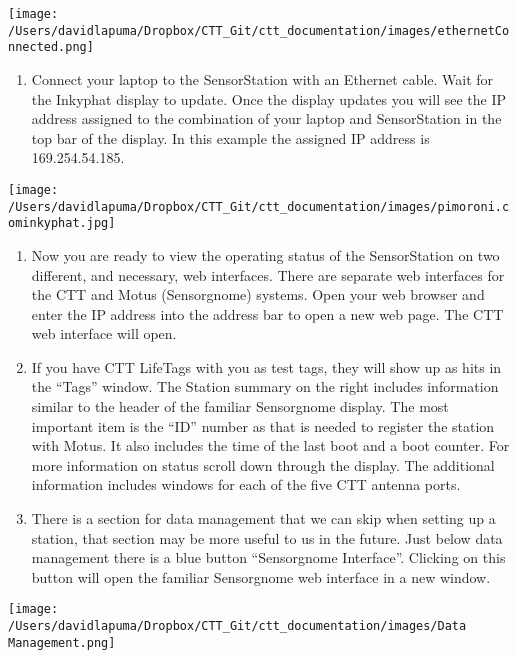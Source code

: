 \documentclass[
]{article}
\providecommand{\tightlist}{%
  \setlength{\itemsep}{0pt}\setlength{\parskip}{0pt}}
\begin{document}
\texttt{[image: /Users/davidlapuma/Dropbox/CTT\_Git/ctt\_documentation/images/ethernetConnected.png]}

\begin{enumerate}
\def\labelenumi{\arabic{enumi}.}
\setcounter{enumi}{7}
\tightlist
\item
  Connect your laptop to the SensorStation with an Ethernet cable. Wait
  for the Inkyphat display to update. Once the display updates you will
  see the IP address assigned to the combination of your laptop and
  SensorStation in the top bar of the display. In this example the
  assigned IP address is 169.254.54.185.
\end{enumerate}

\texttt{[image: /Users/davidlapuma/Dropbox/CTT\_Git/ctt\_documentation/images/pimoroni.cominkyphat.jpg]}

\begin{enumerate}
\def\labelenumi{\arabic{enumi}.}
\setcounter{enumi}{8}
\item
  Now you are ready to view the operating status of the SensorStation on
  two different, and necessary, web interfaces. There are separate web
  interfaces for the CTT and Motus (Sensorgnome) systems. Open your web
  browser and enter the IP address into the address bar to open a new
  web page. The CTT web interface will open.
\item
  If you have CTT LifeTags with you as test tags, they will show up as
  hits in the ``Tags'' window. The Station summary on the right includes
  information similar to the header of the familiar Sensorgnome display.
  The most important item is the ``ID'' number as that is needed to
  register the station with Motus. It also includes the time of the last
  boot and a boot counter. For more information on status scroll down
  through the display. The additional information includes windows for
  each of the five CTT antenna ports.
\item
  There is a section for data management that we can skip when setting
  up a station, that section may be more useful to us in the future.
  Just below data management there is a blue button ``Sensorgnome
  Interface''. Clicking on this button will open the familiar
  Sensorgnome web interface in a new window.
\end{enumerate}

\texttt{[image: /Users/davidlapuma/Dropbox/CTT\_Git/ctt\_documentation/images/Data Management.png]}
\end{document}
